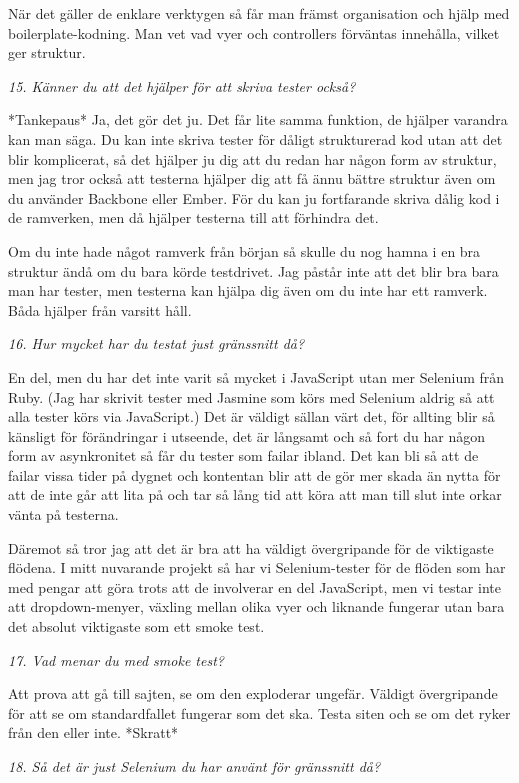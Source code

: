 \documentclass[11pt]{article}
\begin{document}
När det gäller de enklare verktygen så får man främst organisation och hjälp med boilerplate-kodning. Man vet vad vyer och controllers förväntas innehålla, vilket ger struktur.

\emph{15. Känner du att det hjälper för att skriva tester också?}

*Tankepaus* Ja, det gör det ju. Det får lite samma funktion, de hjälper varandra kan man säga. Du kan inte skriva tester för dåligt strukturerad kod utan att det blir komplicerat, så det hjälper ju dig att du redan har någon form av struktur, men jag tror också att testerna hjälper dig att få ännu bättre struktur även om du använder Backbone eller Ember. För du kan ju fortfarande skriva dålig kod i de ramverken, men då hjälper testerna till att förhindra det.

Om du inte hade något ramverk från början så skulle du nog hamna i en bra struktur ändå om du bara körde testdrivet. Jag påstår inte att det blir bra bara man har tester, men testerna kan hjälpa dig även om du inte har ett ramverk. Båda hjälper från varsitt håll.

\emph{16. Hur mycket har du testat just gränssnitt då?}

En del, men du har det inte varit så mycket i JavaScript utan mer Selenium från Ruby. (Jag har skrivit tester med Jasmine som körs med Selenium aldrig så att alla tester körs via JavaScript.) Det är väldigt sällan värt det, för allting blir så känsligt för förändringar i utseende, det är långsamt och så fort du har någon form av asynkronitet så får du tester som failar ibland. Det kan bli så att de failar vissa tider på dygnet och kontentan blir att de gör mer skada än nytta för att de inte går att lita på och tar så lång tid att köra att man till slut inte orkar vänta på testerna.

Däremot så tror jag att det är bra att ha väldigt övergripande för de viktigaste flödena. I mitt nuvarande projekt så har vi Selenium-tester för de flöden som har med pengar att göra trots att de involverar en del JavaScript, men vi testar inte att dropdown-menyer, växling mellan olika vyer och liknande fungerar utan bara det absolut viktigaste som ett smoke test.

\emph{17. Vad menar du med smoke test?}

Att prova att gå till sajten, se om den exploderar ungefär. Väldigt övergripande för att se om standardfallet fungerar som det ska. Testa siten och se om det ryker från den eller inte. *Skratt*

\emph{18. Så det är just Selenium du har använt för gränssnitt då?}
\end{document}
